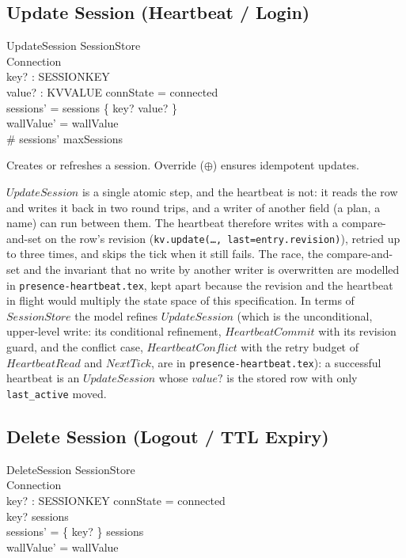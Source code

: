 \documentclass[a4paper,10pt,fleqn]{article}
\begin{document}
\subsection{Update Session (Heartbeat / Login)}

\begin{schema}{UpdateSession}
  \Delta SessionStore \\
  \Xi Connection \\
  key? : SESSIONKEY \\
  value? : KVVALUE
  \where
  connState = connected \\
  sessions' = sessions \oplus \{ key? \mapsto value? \} \\
  wallValue' = wallValue \\
  \# sessions' \leq maxSessions
\end{schema}

Creates or refreshes a session.  Override ($\oplus$) ensures
idempotent updates.

$UpdateSession$ is a single atomic step, and the heartbeat is not: it reads
the row and writes it back in two round trips, and a writer of another field
(a plan, a name) can run between them.  The heartbeat therefore writes with a
compare-and-set on the row's revision (\texttt{kv.update(\ldots,
last=entry.revision)}), retried up to three times, and skips the tick when
it still fails.  The race, the compare-and-set and the invariant that no
write by another writer is overwritten are modelled in
\texttt{presence-heartbeat.tex}, kept apart because the revision and the
heartbeat in flight would multiply the state space of this specification.  In
terms of $SessionStore$ the model refines $UpdateSession$ (which is the
unconditional, upper-level write: its conditional refinement, $HeartbeatCommit$
with its revision guard, and the conflict case, $HeartbeatConflict$ with the
retry budget of $HeartbeatRead$ and $NextTick$, are in
\texttt{presence-heartbeat.tex}): a successful
heartbeat is an $UpdateSession$ whose $value?$ is the stored row with only
\texttt{last\_active} moved.

\subsection{Delete Session (Logout / TTL Expiry)}

\begin{schema}{DeleteSession}
  \Delta SessionStore \\
  \Xi Connection \\
  key? : SESSIONKEY
  \where
  connState = connected \\
  key? \in \dom sessions \\
  sessions' = \{ key? \} \ndres sessions \\
  wallValue' = wallValue
\end{schema}
\end{document}
